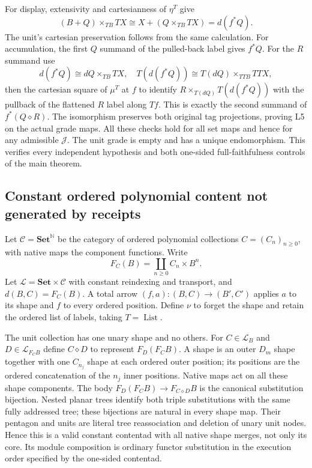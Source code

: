 \documentclass[11pt,a4paper]{article}
\theoremstyle{definition}
\newcommand{\Set}{\mathbf{Set}}
\newcommand{\Lcat}{\mathcal L}
\newcommand{\J}{\mathcal J}
\newcommand{\List}{\operatorname{List}}
\newcommand{\diamondc}{\mathbin{\diamond}}
\begin{document}
For display, extensivity and cartesianness of $\eta^T$ give
\[
 (B+Q)\times_{TB}TX
 \cong X+(Q\times_{TB}TX)=d(f^*Q).
\]
The unit's cartesian preservation follows from the same calculation. For
accumulation, the first $Q$ summand of the pulled-back label gives $f^*Q$.
For the $R$ summand use
\[
 d(f^*Q)\cong dQ\times_{TB}TX,
 \quad
 T(d(f^*Q))\cong T(dQ)\times_{TTB}TTX,
\]
then the cartesian square of $\mu^T$ at $f$ to identify
$R\times_{T(dQ)}T(d(f^*Q))$ with the pullback of the flattened $R$ label
along $Tf$. This is exactly the second summand of $f^*(Q\diamondc R)$.
The isomorphism preserves both original tag projections, proving L5 on the
actual grade maps. All these checks hold for all set maps and hence for any
admissible $\J$. The unit grade is empty and has a unique endomorphism.
This verifies every independent hypothesis and both one-sided full-faithfulness
controls of the main theorem.

\subsection{Constant ordered polynomial content not generated by receipts}
Let $\mathcal C=\Set^{\mathbb N}$ be the category of ordered polynomial
collections $C=(C_n)_{n\ge0}$, with native maps the component functions.
Write
\[
 F_C(B)=\coprod_{n\ge0}C_n\times B^n.
\]
Let $\Lcat=\Set\times\mathcal C$ with constant reindexing and transport, and
$d(B,C)=F_C(B)$. A total arrow $(f,a):(B,C)\to(B',C')$ applies $a$ to its
shape and $f$ to every ordered position. Define $\nu$ to forget the shape and
retain the ordered list of labels, taking $T=\List$.

The unit collection has one unary shape and no others. For $C\in\Lcat_B$
and $D\in\Lcat_{F_CB}$ define $C\diamondc D$ to represent
$F_D(F_C B)$. A shape is an outer $D_m$ shape together with one $C_{n_j}$ shape
at each ordered outer position; its positions are the ordered concatenation
of the $n_j$ inner positions. Native maps act on all these shape components.
The body $F_D(F_CB)\to F_{C\diamondc D}B$ is the canonical substitution
bijection. Nested planar trees identify both triple substitutions with the
same fully addressed tree; these bijections are natural in every shape map.
Their pentagon and units are literal tree reassociation and deletion of unary
unit nodes. Hence this is a valid constant contentad with all native shape
merges, not only its core. Its module composition is ordinary functor
substitution in the execution order specified by the one-sided contentad.
\end{document}
